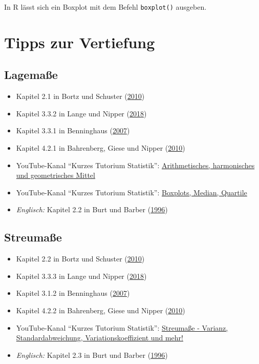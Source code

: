 \documentclass[
  11pt,
  ngerman,
  a4paper,
]{report}
\providecommand{\tightlist}{%
  \setlength{\itemsep}{0pt}\setlength{\parskip}{0pt}}
\newenvironment{rtip}{
  \medskip
  \begin{tcolorbox}[colframe=purple,colback=light_gray,title=Softwarehinweis]
}{
  \end{tcolorbox}
  \medskip
}
\begin{document}
\begin{rtip}
In R lässt sich ein Boxplot mit dem Befehl \verb|boxplot()| ausgeben.
\end{rtip}

\hypertarget{tipps-zur-vertiefung-1}{%
\section*{Tipps zur Vertiefung}\label{tipps-zur-vertiefung-1}}

\hypertarget{lagemauxdfe-1}{%
\subsection{Lagemaße}\label{lagemauxdfe-1}}

\begin{itemize}
\tightlist
\item
  Kapitel 2.1 in Bortz und Schuster (\protect\hyperlink{ref-bortz}{2010})
\item
  Kapitel 3.3.2 in Lange und Nipper (\protect\hyperlink{ref-delange}{2018})
\item
  Kapitel 3.3.1 in Benninghaus (\protect\hyperlink{ref-benninghaus}{2007})
\item
  Kapitel 4.2.1 in Bahrenberg, Giese und Nipper (\protect\hyperlink{ref-bahrenberg}{2010})
\item
  YouTube-Kanal \enquote{Kurzes Tutorium Statistik}: \href{https://www.youtube.com/watch?v=Kx9aHOMVPEg}{Arithmetisches, harmonisches und geometrisches Mittel}
\item
  YouTube-Kanal \enquote{Kurzes Tutorium Statistik}: \href{https://www.youtube.com/watch?v=HsDeAoBOyS4}{Boxplots, Median, Quartile}
\item
  \emph{Englisch:} Kapitel 2.2 in Burt und Barber (\protect\hyperlink{ref-burt}{1996})
\end{itemize}

\hypertarget{streumauxdfe-1}{%
\subsection{Streumaße}\label{streumauxdfe-1}}

\begin{itemize}
\tightlist
\item
  Kapitel 2.2 in Bortz und Schuster (\protect\hyperlink{ref-bortz}{2010})
\item
  Kapitel 3.3.3 in Lange und Nipper (\protect\hyperlink{ref-delange}{2018})
\item
  Kapitel 3.1.2 in Benninghaus (\protect\hyperlink{ref-benninghaus}{2007})
\item
  Kapitel 4.2.2 in Bahrenberg, Giese und Nipper (\protect\hyperlink{ref-bahrenberg}{2010})
\item
  YouTube-Kanal \enquote{Kurzes Tutorium Statistik}: \href{https://www.youtube.com/watch?v=3oZrS3ZWVcA}{Streumaße - Varianz, Standardabweichung, Variationskoeffizient und mehr!}
\item
  \emph{Englisch:} Kapitel 2.3 in Burt und Barber (\protect\hyperlink{ref-burt}{1996})
\end{itemize}
\end{document}
